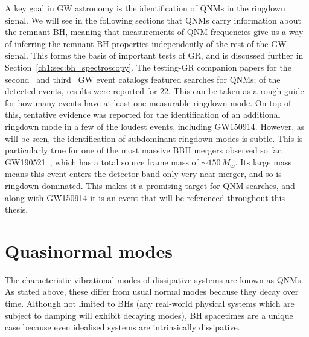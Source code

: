 A key goal in GW astronomy is the identification of QNMs in the ringdown signal.
We will see in the following sections that QNMs carry information about the remnant BH, meaning that measurements of QNM frequencies give us a way of inferring the remnant BH properties independently of the rest of the GW signal.
This forms the basis of important tests of GR, and is discussed further in Section~\ref{ch1:sec:bh_spectroscopy}.
The testing-GR companion papers for the second~\cite{LIGOScientific:2020tif} and third~\cite{LIGOScientific:2021sio} GW event catalogs featured searches for QNMs; of the detected events, results were reported for 22.
This can be taken as a rough guide for how many events have at least one measurable ringdown mode.
On top of this, tentative evidence was reported for the identification of an additional ringdown mode in a few of the loudest events, including GW150914.
However, as will be seen, the identification of subdominant ringdown modes is subtle.
This is particularly true for one of the most massive BBH mergers observed so far, GW190521~\cite{LIGOScientific:2020iuh}, which has a total source frame mass of $\sim 150\,M_\odot$.
Its large mass means this event enters the detector band only very near merger, and so is ringdown dominated.
This makes it a promising target for QNM searches, and along with GW150914 it is an event that will be referenced throughout this thesis. 



\section{Quasinormal modes}
\label{ch1:sec:qnms}

The characteristic vibrational modes of dissipative systems are known as QNMs.
As stated above, these differ from usual normal modes because they decay over time.
Although not limited to BHs (any real-world physical systems which are subject to damping will exhibit decaying modes), BH spacetimes are a unique case because even idealised systems are intrinsically dissipative. %

